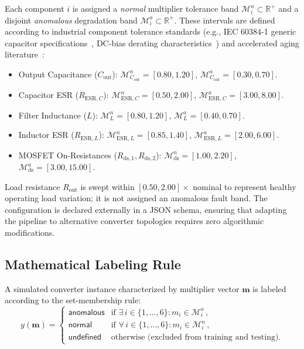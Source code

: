 \documentclass[11pt,a4paper]{article}
\begin{document}
Each component $i$ is assigned a \emph{normal} multiplier tolerance band $\mathcal{M}_i^n \subset \mathbb{R}^+$ and a disjoint \emph{anomalous} degradation band $\mathcal{M}_i^a \subset \mathbb{R}^+$. These intervals are defined according to industrial component tolerance standards (e.g., IEC 60384-1 generic capacitor specifications~\cite{iec60384_1}, DC-bias derating characteristics~\cite{waugh_dcbias}) and accelerated aging literature~\cite{celaya2011mosfet,kulkarni2010electrolytic,dang2020capacitors}:
\begin{itemize}
    \item Output Capacitance ($C_{\mathrm{out}}$): $\mathcal{M}_{C_{\mathrm{out}}}^n = [0.80, 1.20]$, $\mathcal{M}_{C_{\mathrm{out}}}^a = [0.30, 0.70]$.
    \item Capacitor ESR ($R_{\mathrm{ESR},C}$): $\mathcal{M}_{\mathrm{ESR},C}^n = [0.50, 2.00]$, $\mathcal{M}_{\mathrm{ESR},C}^a = [3.00, 8.00]$.
    \item Filter Inductance ($L$): $\mathcal{M}_L^n = [0.80, 1.20]$, $\mathcal{M}_L^a = [0.40, 0.70]$.
    \item Inductor ESR ($R_{\mathrm{ESR},L}$): $\mathcal{M}_{\mathrm{ESR},L}^n = [0.85, 1.40]$, $\mathcal{M}_{\mathrm{ESR},L}^a = [2.00, 6.00]$.
    \item MOSFET On-Resistances ($R_{\mathrm{ds},1}, R_{\mathrm{ds},2}$): $\mathcal{M}_{\mathrm{ds}}^n = [1.00, 2.20]$, $\mathcal{M}_{\mathrm{ds}}^a = [3.00, 15.00]$.
\end{itemize}
Load resistance $R_{\mathrm{out}}$ is swept within $[0.50, 2.00]\times$ nominal to represent healthy operating load variation; it is not assigned an anomalous fault band. The configuration is declared externally in a JSON schema, ensuring that adapting the pipeline to alternative converter topologies requires zero algorithmic modifications.

\subsection{Mathematical Labeling Rule}
A simulated converter instance characterized by multiplier vector $\mathbf{m}$ is labeled according to the set-membership rule:
\begin{equation}
y(\mathbf{m}) =
\begin{cases}
\textsf{anomalous} & \text{if } \exists\, i \in \{1,\dots,6\} : m_i \in \mathcal{M}_i^a\,, \\
\textsf{normal}    & \text{if } \forall\, i \in \{1,\dots,6\} : m_i \in \mathcal{M}_i^n\,, \\
\textsf{undefined} & \text{otherwise (excluded from training and testing).}
\end{cases}
\label{eq:label-rule}
\end{equation}
\end{document}
